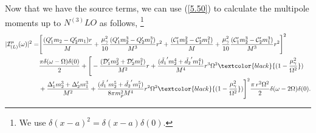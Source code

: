 
Now that we have the source terms, we can use (\ref{5.50}) to calculate the multipole moments up to $N^{(3)}LO$ as follows,
 \footnote{ We use $\delta(x-a)^2=\delta(x-a)\delta(0)$.}
\begin{align}
\begin{split}
 |\mathcal{I}^{\mu}_{(L)}(\omega)|^2= &
\Bigg[\frac{({Q}_1'm_2-{Q}_2'm_1)r}{M}+\frac{\mu_{\gamma}^2}{10}\frac{({Q}_1'm_2^3-{Q}_2'm_1^3)}{M^3}r^2+\frac{(\mathcal{C}_1'm_2^2-\mathcal{C}_2'm_1^2)}{M}+\frac{\mu_{\gamma}^2}{10}\frac{(\mathcal{C}_1'm_2^3-\mathcal{C}_2'm_1^3)}{M^3}r^2\Bigg]^2\\&{\frac{\pi\delta(\omega-\Omega)\delta(0)}{2}}+\Bigg[- \frac{(\mathcal{D}_1'm_2^2+\mathcal{D}_2'm_1^2)}{M^2}r
+\frac{(\tilde{d_1}'m_2^4+\tilde{d_2}'m_1^4)}{M^4}r^3\Omega^2\textcolor{black}{(1-\frac{\mu_{\gamma}^2}{\Omega^2}})
\\&+\frac{\Delta_1'm_2^3+\Delta_2'm_1^3}{M^2} +\frac{(\tilde{d_1}'m_2^5+\tilde{d_2}'m_1^5)}{8\pi m_p^2 M^4}r^2\Omega^2\textcolor{black}{(1-\frac{\mu_{\gamma}^2}{\Omega^2}})
 \Bigg]^2\frac{\pi\, r^2\Omega^2}{2}\delta(\omega-2\Omega)\delta(0).
 \end{split}
 \end{align}

